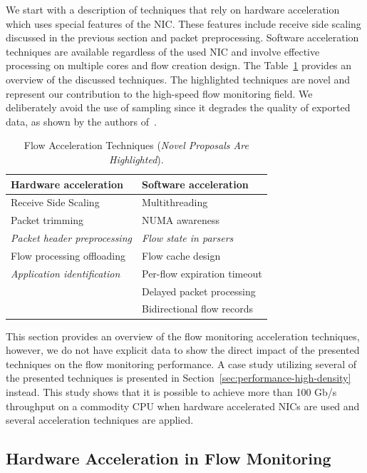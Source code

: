 We start with a description of techniques that rely on hardware acceleration which uses special features of the NIC. These features include receive side scaling discussed in the previous section and packet preprocessing. Software acceleration techniques are available regardless of the used NIC and involve effective processing on multiple cores and flow creation design. The Table~\ref{tab:flow-acc-techniques} provides an overview of the discussed techniques. The highlighted techniques are novel and represent our contribution to the high-speed flow monitoring field. We deliberately avoid the use of sampling since it degrades the quality of exported data, as shown by the authors of~\cite{Brauckhoff-2006-Impact}.

\begin{table}[ht!]
    \centering
    \begin{tabular}{l|l}
    \toprule
    \textbf{Hardware acceleration} & \textbf{Software acceleration} \\ \hline
    Receive Side Scaling & Multithreading \\
    Packet trimming & NUMA awareness \\
    \emph{Packet header preprocessing} & \emph{Flow state in parsers} \\
    Flow processing offloading & Flow cache design \\
    \emph{Application identification} & Per-flow expiration timeout \\ 
    & Delayed packet processing \\ 
    & Bidirectional flow records \\ \bottomrule
    \end{tabular}
    \caption{Flow Acceleration Techniques (\emph{Novel Proposals Are Highlighted}).}
    \label{tab:flow-acc-techniques}
\end{table}

This section provides an overview of the flow monitoring acceleration techniques, however, we do not have explicit data to show the direct impact of the presented techniques on the flow monitoring performance. A case study utilizing several of the presented techniques is presented in Section~\ref{sec:performance-high-density} instead. This study shows that it is possible to achieve more than 100 Gb/s throughput on a commodity CPU when hardware accelerated NICs are used and several acceleration techniques are applied.


\subsection{Hardware Acceleration in Flow Monitoring}\label{sec:performance-hw-acceleration}

